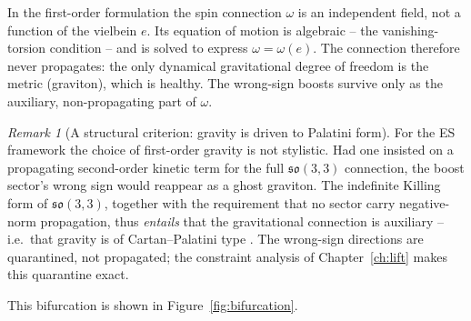 \documentclass[11pt,oneside]{book}
\newcommand{\so}{\mathfrak{so}}
\theoremstyle{plain}
\theoremstyle{definition}
\theoremstyle{remark}
\newtheorem{remark}[theorem]{Remark}
\begin{document}
In the first-order formulation the spin connection $\omega$ is an independent field,
not a function of the vielbein $e$. Its equation of motion is algebraic -- the
vanishing-torsion condition -- and is solved to express $\omega=\omega(e)$. The
connection therefore never propagates: the only dynamical gravitational degree of
freedom is the metric (graviton), which is healthy. The wrong-sign boosts survive
only as the auxiliary, non-propagating part of $\omega$.

\begin{remark}[A structural criterion: gravity is driven to Palatini form]
\label{rem:gravity-palatini}
For the ES framework the choice of first-order gravity is not stylistic. Had one
insisted on a propagating second-order kinetic term for the full $\so(3,3)$
connection, the boost sector's wrong sign would reappear as a ghost graviton. The
indefinite Killing form of $\so(3,3)$, together with the requirement that no sector
carry negative-norm propagation, thus \emph{entails} that the gravitational
connection is auxiliary -- i.e.\ that gravity is of Cartan--Palatini type
\cite{Palatini1919,Cartan1923,Kibble1961,Sciama1964,Peldan1994}. The wrong-sign
directions are quarantined, not propagated; the constraint analysis of
Chapter~\ref{ch:lift} makes this quarantine exact.
\end{remark}

This bifurcation is shown in Figure~\ref{fig:bifurcation}.
\end{document}
